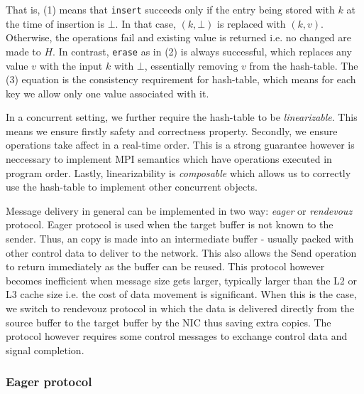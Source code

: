 \documentclass{sig-alternate-05-2015}
\begin{document}
That is, (1) means that \texttt{insert} succeeds only if the entry being stored
with $k$ at the time of insertion is $\bot$.  In that case, $(k,\bot)$ is
replaced with $(k, v)$. Otherwise, the operations fail and existing value is
returned i.e. no changed are made to $H$. In contrast, \texttt{erase} as in (2)
is always successful, which replaces any value $v$ with the input $k$ with
$\bot$, essentially removing $v$ from the hash-table. The (3) equation is the
consistency requirement for hash-table, which means for each key we allow
only one value associated with it.

In a concurrent setting, we further require the hash-table to be
\textit{linearizable}.  This means we ensure firstly safety and correctness
property. Secondly, we ensure operations take affect in a real-time order.
This is a strong guarantee however is neccessary to implement MPI semantics
which have operations executed in program order. Lastly, linearizability is
\textit{composable} which allows us to correctly use the hash-table to
implement other concurrent objects.

Message delivery in general can be implemented in two way: \textit{eager} or \textit{rendevouz}
protocol. Eager protocol is used when the target buffer is not known to the
sender. Thus, an copy is made into an intermediate buffer - usually packed with
other control data to deliver to the network. This also allows the Send
operation to return immediately as the buffer can be reused.  This protocol
however becomes inefficient when message size gets larger, typically larger
than the L2 or L3 cache size i.e. the cost of data movement is significant.
When this is the case, we switch to rendevouz protocol in which the data is
delivered directly from the source buffer to the target buffer by the NIC thus
saving extra copies.  The protocol however requires some control messages to
exchange control data and signal completion.

\subsubsection{Eager protocol}
\end{document}
